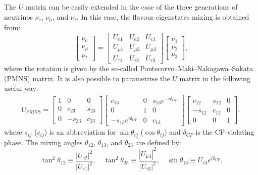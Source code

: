 The $U$ matrix can be easily extended in the case of the three generations of neutrinos $\nu_{e}$, $\nu_{\mu}$, and $\nu_{\tau}$. In this case, the flavour eigenstates mixing is obtained from:
\begin{equation}
\begin{bmatrix}
\nu_{e}\\
\nu_{\mu}\\
\nu_{\tau}
\end{bmatrix}=
\begin{bmatrix} U_{e 1} & U_{e 2} & U_{e 3} \\ U_{\mu 1} & U_{\mu 2} & U_{\mu 3} \\ U_{\tau 1} & U_{\tau 2} & U_{\tau 3} 
\end{bmatrix} 
\begin{bmatrix} \nu_1 \\ \nu_2 \\ \nu_3 \end{bmatrix},
\end{equation}
where the rotation is given by the so-called Pontecorvo–Maki–Nakagawa–Sakata (PMNS) matrix. It is also possible to parametrise the $U$ matrix in the following useful way:
\begin{align} 
  U_{\mathrm{PMNS}} = \begin{bmatrix} 1 & 0 & 0 \\ 0 & c_{23} & s_{23} \\ 0 & -s_{23} & c_{23} \end{bmatrix}
 \begin{bmatrix} c_{13} & 0 & s_{13}e^{-i\delta_{CP}} \\ 0 & 1 & 0 \\ -s_{13}e^{i\delta_{CP}} & 0 & c_{13} \end{bmatrix}
 \begin{bmatrix} c_{12} & s_{12} & 0 \\ -s_{12} & c_{12} & 0 \\ 0 & 0 & 1 \end{bmatrix},\label{eq:pmns}
\end{align}
where  $s_{ij}$ ($c_{ij}$) is an abbreviation for $\sin\theta_{ij}$ ($\cos\theta_{ij}$) and $\delta_{CP}$ is the CP-violating phase. The mixing angles $\theta_{12}$, $\theta_{13}$, and $\theta_{23}$ are defined by:
\begin{equation}
    \tan^2\theta_{12}\equiv\frac{|U_{e2}|^2}{|U_{e1}|^2},\quad
    \tan^2\theta_{23}\equiv\frac{|U_{\mu3}|^2}{|U_{\tau3}|^2},\quad
    \sin\theta_{13}\equiv U_{e3}e^{i\delta_{CP}}.
\end{equation}

